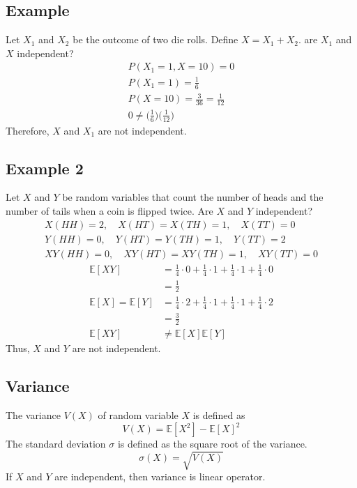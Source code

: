 \documentclass{article}
\theoremstyle{mytheoremstyle}
\theoremstyle{mytheoremstyle}
\theoremstyle{myproblemstyle}
\begin{document}
    \subsection*{Example}
    Let $X_1$ and $X_2$ be the outcome of two die rolls. Define $X=X_1+X_2$. are
    $X_1$ and $X$ independent?
    \begin{align*}
        P(X_1=1, X=10) = 0 \\
        P(X_1 = 1) = \frac{1}{6} \\
        P(X = 10) = \frac{3}{36} = \frac{1}{12} \\
        0 \ne \Big(\frac{1}{6}\Big)\Big(\frac{1}{12}\Big)
    \end{align*}
    Therefore, $X$ and $X_1$ are not independent.

    \subsection*{Example 2}
    Let $X$ and $Y$ be random variables that count the number of heads and the
    number of tails when a coin is flipped twice. Are $X$ and $Y$ independent?
    \begin{gather*}
        X(HH) = 2,\quad X(HT) = X(TH) = 1,\quad X(TT)=0 \\
        Y(HH) = 0,\quad Y(HT) = Y(TH) = 1,\quad Y(TT)=2 \\
        XY(HH)=0,\quad XY(HT) = XY(TH) = 1,\quad XY(TT)=0
    \end{gather*}
    \begin{align*}
        \mathbb{E}[XY] &= \frac{1}{4} \cdot 0 + \frac{1}{4} \cdot 1 + \frac{1}{4} \cdot 1 + \frac{1}{4} \cdot 0 \\
                       &= \frac{1}{2} \\
        \mathbb{E}[X] = \mathbb{E}[Y] &= \frac{1}{4} \cdot 2 + \frac{1}{4} \cdot 1 + \frac{1}{4} \cdot 1 + \frac{1}{4} \cdot 2 \\
                                      &= \frac{3}{2} \\
        \mathbb{E}[XY] &\ne \mathbb{E}[X]\mathbb{E}[Y]
    \end{align*}
    Thus, $X$ and $Y$ are not independent.

    \subsection*{Variance}
    The variance $V(X)$ of random variable $X$ is defined as
    \[
        V(X) = \mathbb{E}[X^2] - \mathbb{E}[X]^2
    \]
    The standard deviation $\sigma$ is defined as the square root of the variance.
    \[
        \sigma(X) = \sqrt{V(X)}
    \]
    If $X$ and $Y$ are independent, then variance is linear operator.
\end{document}
